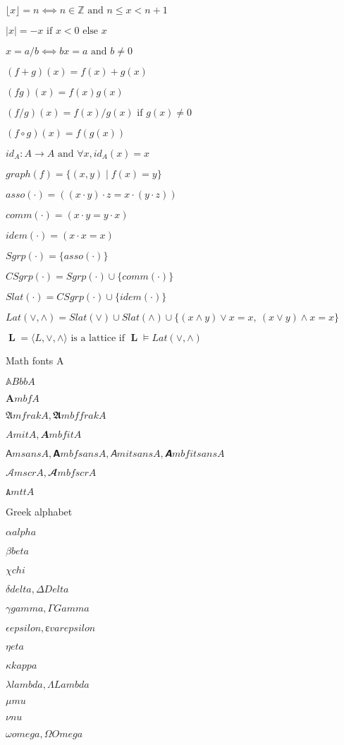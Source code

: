 \documentclass{article}
\begin{document}
$⌊x⌋ = n ⟺ n ∈ ℤ \text{ and } n ≤ x < n+1$

$|x| = −x \text{ if } x < 0 \text{ else } x$

$x = a/b ⟺ bx = a \text{ and } b ≠ 0$

$(f+g)(x) = f(x) + g(x)$

$(fg)(x) = f(x)g(x)$

$(f/g)(x) = f(x)/g(x) \text{ if } g(x) ≠ 0$

$(f∘g)(x) = f(g(x))$

$id_A : A → A \text{ and } ∀x, id_A(x) = x$

$graph(f) = \{(x,y) ∣ f(x) = y\}$

$asso(\cdot) = ((x\cdot y)\cdot z=x\cdot (y\cdot z))$

$comm(\cdot) = (x\cdot y=y\cdot x)$

$idem(\cdot) = (x\cdot x=x)$

$Sgrp(\cdot) = \{asso(\cdot)\}$

$CSgrp(\cdot) = Sgrp(\cdot)\cup \{comm(\cdot)\}$

$Slat(\cdot) = CSgrp(\cdot)\cup\{idem(\cdot)\}$

$Lat(\vee,\wedge) = Slat(\vee) \cup Slat(\wedge) \cup 
\{(x\wedge y)\vee x=x,\ (x\vee y)\wedge x=x\}$

$\mbfL=\langle L,\vee,\wedge\rangle \text{ is a lattice if } \mbfL\models Lat(\vee,\wedge)$

Math fonts A

$𝔸 BbbA$

$𝐀 mbfA$

$𝔄 mfrakA, 𝕬 mbffrakA$

$𝐴 mitA, 𝑨 mbfitA$

$𝖠 msansA, 𝗔 mbfsansA, 𝘈 mitsansA, 𝘼 mbfitsansA$

$𝒜 mscrA, 𝓐 mbfscrA$

$𝙰 mttA$

Greek alphabet

$α alpha$

$β beta$

$χ chi$

$δ delta, Δ Delta$

$γ gamma, Γ Gamma$

$ϵ epsilon, ɛ varepsilon$

$η eta$

$κ kappa$

$λ lambda, Λ Lambda$

$μ mu$

$ν nu$

$ω omega, Ω Omega$
\end{document}
